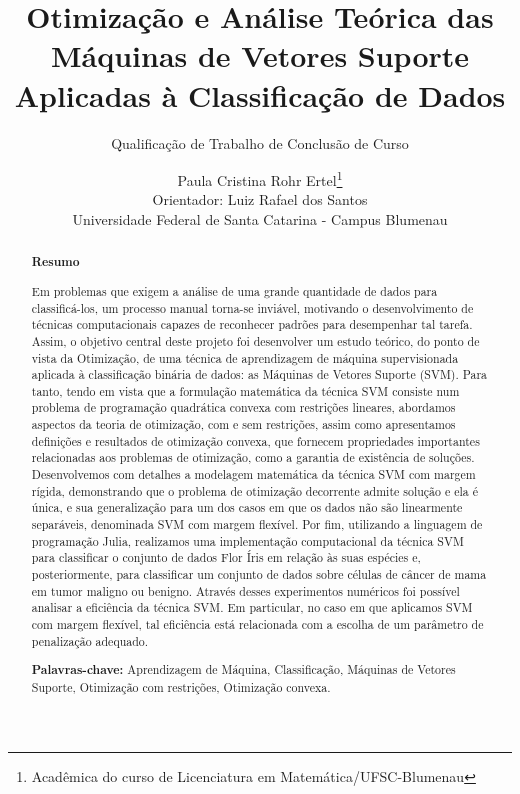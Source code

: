\documentclass[12pt,a4paper]{scrartcl}
\theoremstyle{definition}%
\begin{document}
\title{Otimização e Análise Teórica das Máquinas de Vetores Suporte Aplicadas à Classificação de Dados} 
\author{ \normalfont Paula Cristina Rohr Ertel\thanks{Acadêmica do curso de Licenciatura em Matemática/UFSC-Blumenau} \\ \small Orientador: Luiz Rafael dos Santos \\ \small Universidade Federal de Santa Catarina - Campus Blumenau}
\subtitle{Qualificação de Trabalho de Conclusão de Curso}
\maketitle

\begin{abstract}

\begin{center}
\textbf{Resumo}
\end{center}

Em problemas que exigem a análise de uma grande quantidade de dados para classificá-los, um processo manual torna-se inviável, motivando o desenvolvimento de técnicas computacionais capazes de reconhecer padrões para desempenhar tal tarefa. Assim, o objetivo central deste projeto foi desenvolver um estudo teórico, do ponto de vista da Otimização, de uma técnica de aprendizagem de máquina supervisionada aplicada à classificação binária de dados: as Máquinas de Vetores Suporte (SVM). Para tanto, tendo em vista que a formulação matemática da técnica SVM consiste num problema de programação quadrática convexa com restrições lineares, abordamos aspectos da teoria de otimização, com e sem restrições, assim como apresentamos definições e resultados de otimização convexa, que fornecem propriedades importantes relacionadas aos problemas de otimização, como a garantia de existência de soluções. Desenvolvemos com detalhes a modelagem matemática da técnica SVM com margem rígida, demonstrando que o problema de otimização decorrente admite solução e ela é única, e sua generalização para um dos casos em que os dados não são linearmente separáveis, denominada SVM com margem flexível. Por fim, utilizando a linguagem de programação Julia, realizamos uma implementação computacional da técnica SVM para classificar o conjunto de dados Flor Íris em relação às suas espécies e, posteriormente, para classificar um conjunto de dados sobre células de câncer de mama em tumor maligno ou benigno. Através desses experimentos numéricos foi possível analisar a eficiência da técnica SVM. Em particular, no caso em que aplicamos SVM com margem flexível, tal eficiência está relacionada com a escolha de um parâmetro de penalização adequado.

\textbf{Palavras-chave:} Aprendizagem de Máquina, Classificação, Máquinas de Vetores Suporte, Otimização com restrições, Otimização convexa.
\end{abstract}
\end{document}
